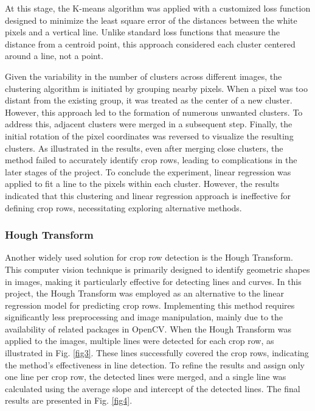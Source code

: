 \documentclass[conference]{IEEEtran}
\begin{document}
At this stage, the K-means algorithm was applied with a customized loss function designed to minimize the least square error of the distances between the white pixels and a vertical line. Unlike standard loss functions that measure the distance from a centroid point, this approach considered each cluster centered around a line, not a point.

Given the variability in the number of clusters across different images, the clustering algorithm is initiated by grouping nearby pixels. When a pixel was too distant from the existing group, it was treated as the center of a new cluster. However, this approach led to the formation of numerous unwanted clusters. To address this, adjacent clusters were merged in a subsequent step. Finally, the initial rotation of the pixel coordinates was reversed to visualize the resulting clusters. As illustrated in the results, even after merging close clusters, the method failed to accurately identify crop rows, leading to complications in the later stages of the project. To conclude the experiment, linear regression was applied to fit a line to the pixels within each cluster. However, the results indicated that this clustering and linear regression approach is ineffective for defining crop rows, necessitating exploring alternative methods.

\subsubsection{Hough Transform}\label{Hough Transform}
Another widely used solution for crop row detection is the Hough Transform. This computer vision technique is primarily designed to identify geometric shapes in images, making it particularly effective for detecting lines and curves. In this project, the Hough Transform was employed as an alternative to the linear regression model for predicting crop rows. Implementing this method requires significantly less preprocessing and image manipulation, mainly due to the availability of related packages in OpenCV. When the Hough Transform was applied to the images, multiple lines were detected for each crop row, as illustrated in Fig. 
\ref{fig3}. These lines successfully covered the crop rows, indicating the method's effectiveness in line detection. To refine the results and assign only one line per crop row, the detected lines were merged, and a single line was calculated using the average slope and intercept of the detected lines. The final results are presented in Fig. 
\ref{fig4}.
\end{document}
